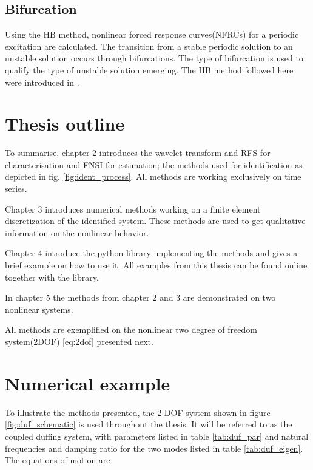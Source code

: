 \subsection{Bifurcation}
\label{sec:bifurcation}


Using the HB method, nonlinear forced response curves(NFRCs) for a periodic
excitation are calculated. The transition from a stable periodic solution to an
unstable solution occurs through bifurcations. The type of bifurcation is used
to qualify the type of unstable solution emerging. The HB method followed here
were introduced in \autocite{detroux2015a}.



\section{Thesis outline}
\label{sec:thesis-outline}

To summarise, chapter 2 introduces the wavelet transform and RFS for
characterisation and FNSI for estimation; the methods used for identification as
depicted in fig. \ref{fig:ident_process}. All methods are working exclusively on
time series.

Chapter 3 introduces numerical methods working on a finite element
discretization of the identified system. These methods are used to get
qualitative information on the nonlinear behavior.

Chapter 4 introduce the python library implementing the methods and gives a
brief example on how to use it. All examples from this thesis can be found
online together with the library.

In chapter 5 the methods from chapter 2 and 3 are demonstrated on two nonlinear
systems.

All methods are exemplified on the nonlinear two degree of freedom system(2DOF)
\eqref{eq:2dof} presented next.



\section{Numerical example}
\label{sec:numerical-example}


To illustrate the methods presented, the 2-DOF system shown in figure
\ref{fig:duf_schematic} is used throughout the thesis. It will be referred to as
the coupled duffing system, with parameters listed in table \ref{tab:duf_par}
and natural frequencies and damping ratio for the two modes listed in table
\ref{tab:duf_eigen}. The equations of motion are

